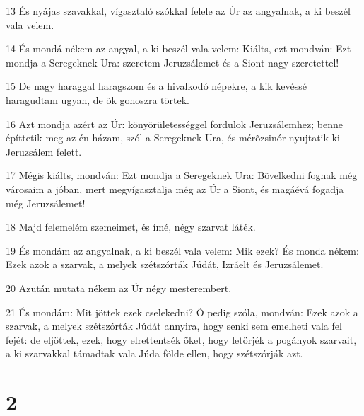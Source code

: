 \par 13 És nyájas szavakkal, vígasztaló szókkal felele az Úr az angyalnak, a ki beszél vala velem.
\par 14 És mondá nékem az angyal, a ki beszél vala velem: Kiálts, ezt mondván: Ezt mondja a Seregeknek Ura: szeretem Jeruzsálemet és a Siont nagy szeretettel!
\par 15 De nagy haraggal haragszom és a hivalkodó népekre, a kik kevéssé haragudtam ugyan, de õk gonoszra törtek.
\par 16 Azt mondja azért az Úr: könyörületességgel fordulok Jeruzsálemhez; benne építtetik meg az én házam, szól a Seregeknek Ura, és mérõzsinór nyujtatik ki Jeruzsálem felett.
\par 17 Mégis kiálts, mondván: Ezt mondja a Seregeknek Ura: Bõvelkedni fognak még városaim a jóban, mert megvígasztalja még az Úr a Siont, és magáévá fogadja még Jeruzsálemet!
\par 18 Majd felemelém szemeimet, és ímé, négy szarvat láték.
\par 19 És mondám az angyalnak, a ki beszél vala velem: Mik ezek? És monda nékem: Ezek azok a szarvak, a melyek szétszórták Júdát, Izráelt és Jeruzsálemet.
\par 20 Azután mutata nékem az Úr négy mesterembert.
\par 21 És mondám: Mit jöttek ezek cselekedni? Õ pedig szóla, mondván: Ezek azok a szarvak, a melyek szétszórták Júdát annyira, hogy senki sem emelheti vala fel fejét: de eljöttek, ezek, hogy elrettentsék õket, hogy letörjék a pogányok szarvait, a ki szarvakkal támadtak vala Júda földe ellen, hogy szétszórják azt.

\chapter{2}

